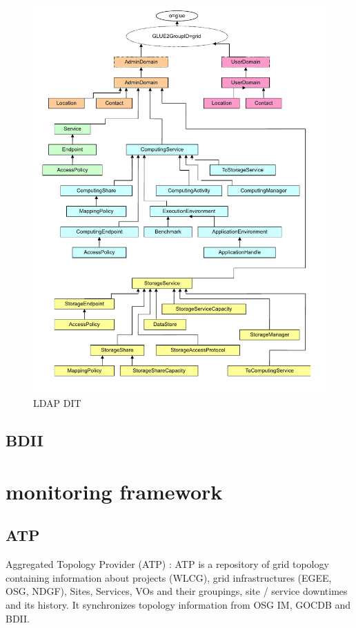\begin{figure}[htb]
\centering
 \includegraphics[width=6in]{images/glue2}
\caption{LDAP DIT}
\label{figure:gluedit}
\end{figure}

\subsection{BDII}




\section{monitoring framework}

\subsection{ATP}
Aggregated Topology Provider (ATP) : ATP is a repository of grid topology
containing information about projects (WLCG), grid infrastructures (EGEE, OSG,
NDGF), Sites, Services, VOs and their groupings, site / service downtimes and
its history. It synchronizes topology information from OSG IM, GOCDB and BDII.

